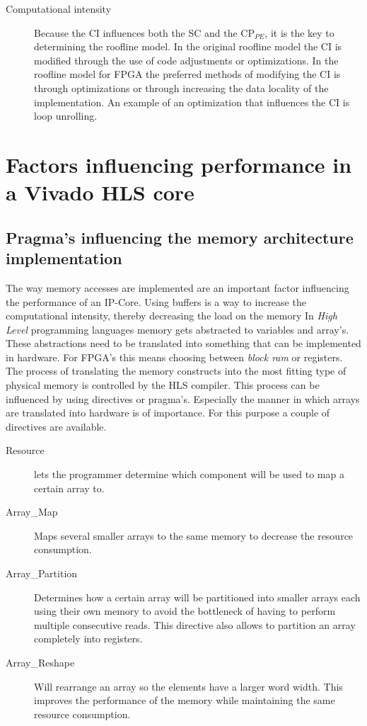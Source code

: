 \begin{description}
	\item[Computational intensity] Because the CI influences both the SC and the CP$_{PE}$, it is the key to determining the roofline model. In the original roofline model the CI is modified through the use of code adjustments or optimizations. In the roofline model for FPGA the preferred methods of modifying the CI is through optimizations or through increasing the data locality of the implementation. An example of an optimization that influences the CI is loop unrolling.

\end{description}

\section{Factors influencing performance in a Vivado HLS core}

\subsection{Pragma's influencing the memory architecture implementation}

The way memory accesses are implemented are an important factor influencing the performance of an IP-Core. Using buffers is a way to increase the computational intensity, thereby decreasing the load on the memory 
In \emph{High Level} programming languages memory gets abstracted to variables and array's. These abstractions need to be translated into something that can be implemented in hardware. For FPGA's this means choosing between \emph{block ram} or registers. The process of translating the memory constructs into the most fitting type of physical memory is controlled by the HLS compiler. This process can be influenced by using directives or pragma's. Especially the manner in which arrays are translated into hardware is of importance. For this purpose a couple of directives are available.\\

\begin{description}

\item[Resource] lets the programmer determine which component will be used to map a certain array to.

\item[Array\_Map] Maps several smaller arrays to the same memory to decrease the resource consumption.

\item[Array\_Partition] Determines how a certain array will be partitioned into smaller arrays each using their own memory to avoid the bottleneck of having to perform multiple consecutive reads. This directive also allows to partition an array completely into registers.

\item[Array\_Reshape] Will rearrange an array so the elements have a larger word width. This improves the performance of the memory while maintaining the same resource consumption.

\end{description}

